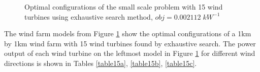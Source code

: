 \begin{figure}[H]
            \qquad
            \qquad
            \caption{Optimal configurations of the small scale problem with 15 wind turbines using exhaustive search method, $obj=0.002112\;kW^{-1}$}
            \label{small15}
        \end{figure}
        
        The wind farm models from Figure \ref{small15} show the optimal configurations of a 1km by 1km wind farm with 15 wind turbines found by exhaustive search. The power output of each wind turbine on the leftmost model in Figure \ref{small15} for different wind directions is shown in Tables \ref{table15a}, \ref{table15b}, \ref{table15c}.
        

